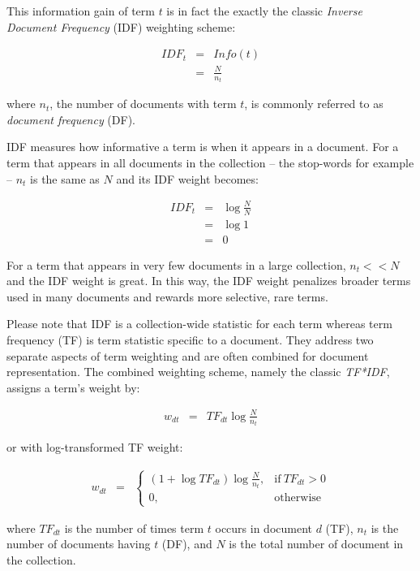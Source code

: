 \documentclass[
  letterpaper,
]{scrbook}
\begin{document}
This information gain of term \(t\) is in fact the exactly the classic
\emph{Inverse Document Frequency} (IDF) weighting scheme:

\[\begin{aligned}
  IDF_t
  & = & Info(t) \\
  & = & \frac{N}{n_t}
\end{aligned}\]

where \(n_t\), the number of documents with term \(t\), is commonly
referred to as \emph{document frequency} (DF).

IDF measures how informative a term is when it appears in a document.
For a term that appears in all documents in the collection -- the
stop-words for example -- \(n_t\) is the same as \(N\) and its IDF
weight becomes:

\[\begin{aligned}
  IDF_t & = & \log \frac{N}{N} \\
        & = & \log 1 \\
        & = & 0
\end{aligned}\]

For a term that appears in very few documents in a large collection,
\(n_t << N\) and the IDF weight is great. In this way, the IDF weight
penalizes broader terms used in many documents and rewards more
selective, rare terms.

Please note that IDF is a collection-wide statistic for each term
whereas term frequency (TF) is term statistic specific to a document.
They address two separate aspects of term weighting and are often
combined for document representation. The combined weighting scheme,
namely the classic \emph{TF*IDF}, assigns a term's weight by:

\[\begin{aligned}
w_{dt} & = & TF_{dt} \log \frac{N}{n_t}
\end{aligned}\]

or with log-transformed TF weight:

\[\begin{aligned}
w_{dt} & = &
\begin{cases}
  (1 + \log TF_{dt}) \log \frac{N}{n_t} , & \text{if}\ TF_{dt}>0 \\
  0, & \text{otherwise}
\end{cases}
\end{aligned}\]

where \(TF_{dt}\) is the number of times term \(t\) occurs in document
\(d\) (TF), \(n_t\) is the number of documents having \(t\) (DF), and
\(N\) is the total number of document in the collection.
\end{document}
